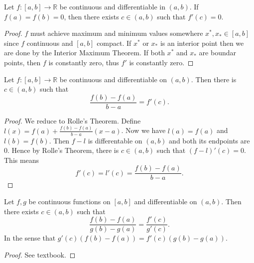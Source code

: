 \begin{theorem}
	Let $f: [a,b] \to \mathbb{R}$ be continuous and differentiable in $(a,b)$. If $f(a) = f(b)  =0$, then there exists $c \in (a,b)$ such that $f'(c) = 0$.
\end{theorem}
\begin{proof}
	$f$ must achieve maximum and minimum values somewhere $x^*, x_* \in [a,b]$ since $f$ continuous and $[a,b]$ compact. If $x^*$ or $x_*$ is an interior point then we are done by the Interior Maximum Theorem. If both $x^*$ and $x_*$ are boundar points, then $f$ is constantly zero, thus $f'$ is constantly zero.
\end{proof}

\begin{theorem}
	Let $f: [a,b]\to \mathbb{R}$ be continuous and differentiable on $(a,b)$. Then there is $c \in (a,b)$ such that 
	\[
		\frac{f(b) - f(a)}{b-a} = f'(c)
	.\] 
\end{theorem}
\begin{proof}
	We reduce to Rolle's Theorem. Define $l(x) = f(a) + \frac{f(b) - f(a)}{b-a}(x-a)$. Now we have  $l(a) = f(a)$ and $l(b) = f(b)$. Then $f - l$ is differentable on $(a,b)$ and both its endpoints are $0$. Hence by Rolle's Theorem, there is $c \in (a,b)$ such that $(f-l)'(c) = 0$. This means
	\[
		f'(c) = l'(c) = \frac{f(b) - f(a)}{b-a}
	.\] 
\end{proof}

\begin{theorem}
	Let $f,g$ be continuous functions on $[a,b]$ and differentiable on $(a,b)$. Then there exists $c \in (a,b)$ such that
	\[
		\frac{f(b) - f(a)}{g(b) - g(a)} = \frac{f'(c)}{g'(c)}
	.\] 
	In the sense that $g'(c)\left( f(b) - f(a) \right)  = f'(c)\left( g(b) - g(a) \right) $.
\end{theorem}
\begin{proof}
	See textbook.
\end{proof}


